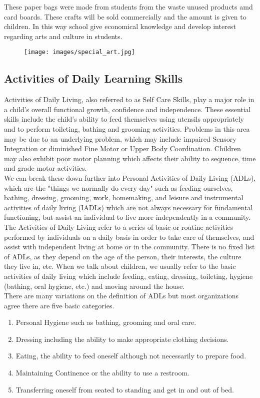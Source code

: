 These paper bags were made from students from the waste unused products amd card boards. These crafts will be sold commercially and the amount is given to children. In this way school give economical knowledge and develop interest regarding arts and culture in students.
\begin{figure}[H]
    \centering
    \texttt{[image: images/special\_art.jpg]}
\end{figure}
\subsection{Activities of Daily Learning Skills}
Activities of Daily Living, also referred to as Self Care Skills, play a major role in a child's overall functional growth, confidence and independence. These essential skills include the child's ability to feed themselves using utensils appropriately and to perform toileting, bathing and grooming activities. Problems in this area may be due to an underlying problem, which may include impaired Sensory Integration or diminished Fine Motor or Upper Body Coordination. Children may also exhibit poor motor planning which affects their ability to sequence, time and grade motor activities.\\

We can break these down further into Personal Activities of Daily Living (ADLs), which are the "things we normally do every day" such as feeding ourselves, bathing, dressing, grooming, work, homemaking, and leisure and instrumental activities of daily living (IADLs) which are not always necessary for fundamental functioning, but assist an individual to live more independently in a community. \\

The Activities of Daily Living refer to a series of basic or routine activities performed by individuals on a daily basis in order to take care of themselves, and assist with independent living at home or in the community. There is no fixed list of ADLs, as they depend on the age of the person, their interests, the culture they live in, etc. When we talk about children, we usually refer to the basic activities of daily living which include feeding, eating, dressing, toileting, hygiene (bathing, oral hygiene, etc.) and moving around the house. \\

There are many variations on the definition of ADLs but most organizations agree there are five basic categories.  
\begin{enumerate}
    \item Personal Hygiene such as bathing, grooming and oral care.
    \item Dressing including the ability to make appropriate clothing decisions.
    \item Eating, the ability to feed oneself although not necessarily to prepare food.
    \item Maintaining Continence or the ability to use a restroom.
    \item Transferring oneself from seated to standing and get in and out of bed.
\end{enumerate}

